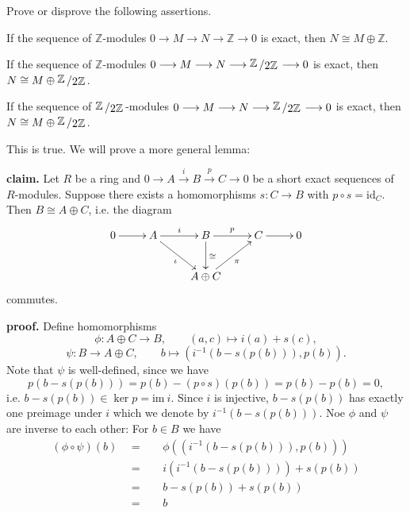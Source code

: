 \documentclass[11pt]{book}
\numberwithin{dummy}{section}
\theoremstyle{nonumberbreak}
\newenvironment{sol}[1][]{\ifthenelse{\equal{#1}{}}{\solution}{\solution[#1]}\rm}{\endsolution}
\newenvironment{prob}[1][]{\ifthenelse{\equal{#1}{}}{\problem}{\problem[#1]}\rm}{\endproblem}
\newcommand{\la}{\longrightarrow}
\newcommand{\id}{\mathrm{id}}
\newcommand{\Z}{\mathbb{Z}}
\newcommand{\slant}[2]{{\raisebox{.1em}{$#1$}\left/\raisebox{-.1em}{$#2$}\right.}}
\begin{document}
\begin{spacing}{1.4}
\begin{prob} %
Prove or disprove the following assertions.
\begin{compactenum}
\item If the sequence of $\Z$-modules $0 \la M \la N \la \Z \la 0$ is exact, then $N \cong M \oplus \Z$.
\item If the sequence of $\Z$-modules $0 \la M \la N \la \slant{\Z}{2 \Z} \la 0$ is exact, then $N \cong M \oplus \slant{\Z}{2\Z}$.
\item If the sequence of $\slant{\Z}{2\Z}$-modules $0 \la M \la N \la \slant{\Z}{2\Z} \la 0$ is exact, then $N \cong M \oplus \slant{\Z}{2\Z}$.
\end{compactenum}
\begin{sol}
\begin{compactenum}
\item This is true. We will prove a more general lemma:
\begin{compactenum}
\item[\textbf{claim.}] Let $R$ be a ring and $0\la A \overset{i}{\la} B \overset{p}{\la} C \la 0$ be a short exact sequences of $R$-modules. Suppose there exists a homomorphisms $s: C \la B$ with $p \circ s = \id_C$. Then $B \cong A \oplus C$, i.e. the diagram
$$
\begin{xy}
\xymatrix{
0 \ar[r] & A \ar[r]^{i} \ar[rd]_{\iota} & B \ar[d]^{\cong} \ar[r]^{p} & C \ar[r] & 0 \\ && A \oplus C \ar[ru]_{\pi} &&
}
\end{xy}
$$
commutes.
\item[\textbf{proof.}] Define homomorphisms
$$\phi: A \oplus C \la B, \qquad (a,c) \mapsto i(a) +s (c),$$
$$\psi: B \la A \oplus C, \qquad b \mapsto \left(i^{-1}\left(b-s(p(b))\right), p(b)\right).$$
Note that $\psi$ is well-defined, since we have 
$$p\left( b-s(p(b))\right) = p(b) - (p \circ s)(p(b)) = p(b) - p(b) =0,$$
i.e. $b- s(p(b)) \in \ker p = \mathrm{im} \ i$. Since $i$ is injective, $b-s(p(b))$ has exactly one preimage under $i$ which we denote by $i^{-1}\left(b-s(p(b))\right)$. Noe $\phi$ and $\psi$ are inverse to each other: For $b \in B$ we have
\begin{alignat*}{5}
(\phi \circ \psi)(b) \ \  &=&& \ \ \phi \left(\left(i^{-1}( b - s(p(b))), p(b) \right)\right) \\
&=&& \ \ i \left( i^{-1}\left(b-s(p(b))\right) \right) + s(p(b)) \\
&=&& \ \ b- s(p(b)) + s(p(b)) \\
&=&& \ \ b
\end{alignat*}

\end{compactenum}
\end{compactenum}
\end{sol}
\end{prob}
\end{spacing}
\end{document}
